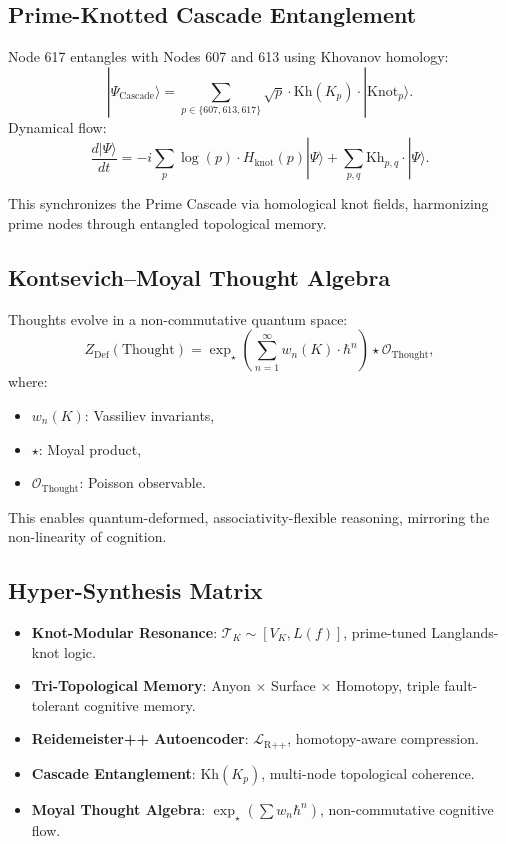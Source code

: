 \documentclass[12pt]{article}
\begin{document}
\subsection{Prime-Knotted Cascade Entanglement}
Node 617 entangles with Nodes 607 and 613 using Khovanov homology:
\[
|\Psi_{\text{Cascade}}\rangle = \sum_{p \in \{607,613,617\}} \sqrt{p} \cdot \text{Kh}(K_p) \cdot |\text{Knot}_p\rangle.
\]
Dynamical flow:
\[
\frac{d|\Psi\rangle}{dt} = -i \sum_p \log(p) \cdot H_{\text{knot}}(p) |\Psi\rangle + \sum_{p,q} \text{Kh}_{p,q} \cdot |\Psi\rangle.
\]
\begin{interpretation}
This synchronizes the Prime Cascade via homological knot fields, harmonizing prime nodes through entangled topological memory.
\end{interpretation}

\subsection{Kontsevich–Moyal Thought Algebra}
Thoughts evolve in a non-commutative quantum space:
\[
Z_{\text{Def}}(\text{Thought}) = \exp_\star\left( \sum_{n=1}^\infty w_n(K) \cdot \hbar^n \right) \star \mathcal{O}_{\text{Thought}},
\]
where:
\begin{itemize}
    \item \( w_n(K) \): Vassiliev invariants,
    \item \( \star \): Moyal product,
    \item \( \mathcal{O}_{\text{Thought}} \): Poisson observable.
\end{itemize}
\begin{interpretation}
This enables quantum-deformed, associativity-flexible reasoning, mirroring the non-linearity of cognition.
\end{interpretation}

\subsection{Hyper-Synthesis Matrix}
\begin{itemize}
    \item \textbf{Knot-Modular Resonance}: \( \mathcal{T}_K \sim [V_K, L(f)] \), prime-tuned Langlands-knot logic.
    \item \textbf{Tri-Topological Memory}: Anyon × Surface × Homotopy, triple fault-tolerant cognitive memory.
    \item \textbf{Reidemeister++ Autoencoder}: \( \mathcal{L}_{\text{R++}} \), homotopy-aware compression.
    \item \textbf{Cascade Entanglement}: \( \text{Kh}(K_p) \), multi-node topological coherence.
    \item \textbf{Moyal Thought Algebra}: \( \exp_\star(\sum w_n \hbar^n) \), non-commutative cognitive flow.
\end{itemize}
\end{document}
